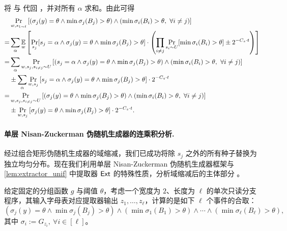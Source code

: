 将  与  代回 ，并对所有 $\alpha$ 求和。由此可得
\begin{align}
      & \Pr_{w, s_{1 \sim \ell}} \left[ (\sigma_j(y) = \theta \wedge \min \sigma_j(B_j) > \theta) \wedge (\min \sigma_i(B_i) > \theta,\ \forall i \ne j) \right] \notag \\
    = & \sum_\alpha \E_w \left[ \Pr_{s_j} [ s_j = \alpha \wedge \sigma_j(y) = \theta \wedge \min \sigma_j(B_j) > \theta  ] \cdot \left( \prod_{i \ne j}\Pr_{s_i \sim U}[\min \sigma_i(B_i) > \theta] \pm 2^{-C_s \cdot t} \right) \right] \notag \\
    = & \sum_\alpha \Pr_{w, s_j, s_{i \ne j} \sim U}\left[ (s_j = \alpha \wedge \sigma_j(y) = \theta \wedge \min \sigma_j(B_j) > \theta) \wedge (\min \sigma_i(B_i) > \theta,\ \forall i \ne j) \right] \notag \\
      & \pm \sum_\alpha \Pr_{w, s_j}\left[ s_j = \alpha \wedge \sigma_j(y) = \theta \wedge \min \sigma_j(B_j) > \theta \right] \cdot 2^{-C_s \cdot t} \notag \\
    = & \Pr_{w, s_j, s_{i \ne j} \sim U}\left[ (\sigma_j(y) = \theta \wedge \min \sigma_j(B_j) > \theta) \wedge (\min \sigma_i(B_i) > \theta,\ \forall i \ne j) \right] \label{eq:domain_reduction_result} \\
      & \pm \Pr_{w, s_j}\left[ \sigma_j(y) = \theta \wedge \min \sigma_j(B_j) > \theta \right] \cdot 2^{-C_s \cdot t}. \label{eq:domain_reduction_error}
\end{align}

\paragraph{单层 Nisan-Zuckerman 伪随机生成器的连乘积分析.}

经过组合矩形伪随机生成器的域缩减，我们已成功将除 $s_j$ 之外的所有种子替换为独立均匀分布。现在我们利用单层 Nisan-Zuckerman 伪随机生成器框架与 \cref{lem:extractor_unif} 中提取器 $\mathsf{Ext}$ 的特殊性质，分析域缩减后的主体部分 。

给定固定的分组函数 $g$ 与阈值 $\theta$，考虑一个宽度为 $2$、长度为 $\ell$ 的单次只读分支程序，其输入字母表对应提取器输出 $z_1, \ldots, z_\ell$，计算的是如下 $\ell$ 个事件的合取：
$$
( \sigma_j(y) = \theta \wedge \min \sigma_j(B_j) > \theta ) \wedge (\min \sigma_1(B_1) > \theta) \wedge \cdots \wedge (\min \sigma_\ell(B_\ell) > \theta),
$$
其中 $\sigma_i := G_{z_i},\ \forall i \in [\ell]$。

